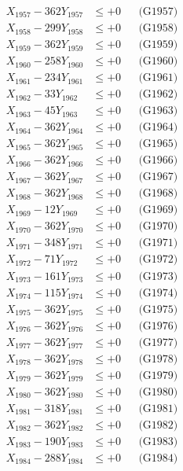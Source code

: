 \documentclass[a4paper,10pt]{article}
\begin{document}
{\begin{align}
X_{1957} - 362Y_{1957} &\leq +0 && \text{(G1957)} \\
X_{1958} - 299Y_{1958} &\leq +0 && \text{(G1958)} \\
X_{1959} - 362Y_{1959} &\leq +0 && \text{(G1959)} \\
X_{1960} - 258Y_{1960} &\leq +0 && \text{(G1960)} \\
\allowbreak
X_{1961} - 234Y_{1961} &\leq +0 && \text{(G1961)} \\
X_{1962} - 33Y_{1962} &\leq +0 && \text{(G1962)} \\
X_{1963} - 45Y_{1963} &\leq +0 && \text{(G1963)} \\
X_{1964} - 362Y_{1964} &\leq +0 && \text{(G1964)} \\
X_{1965} - 362Y_{1965} &\leq +0 && \text{(G1965)} \\
X_{1966} - 362Y_{1966} &\leq +0 && \text{(G1966)} \\
X_{1967} - 362Y_{1967} &\leq +0 && \text{(G1967)} \\
X_{1968} - 362Y_{1968} &\leq +0 && \text{(G1968)} \\
X_{1969} - 12Y_{1969} &\leq +0 && \text{(G1969)} \\
X_{1970} - 362Y_{1970} &\leq +0 && \text{(G1970)} \\
\allowbreak
X_{1971} - 348Y_{1971} &\leq +0 && \text{(G1971)} \\
X_{1972} - 71Y_{1972} &\leq +0 && \text{(G1972)} \\
X_{1973} - 161Y_{1973} &\leq +0 && \text{(G1973)} \\
X_{1974} - 115Y_{1974} &\leq +0 && \text{(G1974)} \\
X_{1975} - 362Y_{1975} &\leq +0 && \text{(G1975)} \\
X_{1976} - 362Y_{1976} &\leq +0 && \text{(G1976)} \\
X_{1977} - 362Y_{1977} &\leq +0 && \text{(G1977)} \\
X_{1978} - 362Y_{1978} &\leq +0 && \text{(G1978)} \\
X_{1979} - 362Y_{1979} &\leq +0 && \text{(G1979)} \\
X_{1980} - 362Y_{1980} &\leq +0 && \text{(G1980)} \\
\allowbreak
X_{1981} - 318Y_{1981} &\leq +0 && \text{(G1981)} \\
X_{1982} - 362Y_{1982} &\leq +0 && \text{(G1982)} \\
X_{1983} - 190Y_{1983} &\leq +0 && \text{(G1983)} \\
X_{1984} - 288Y_{1984} &\leq +0 && \text{(G1984)} \\

\end{align}}
\end{document}
